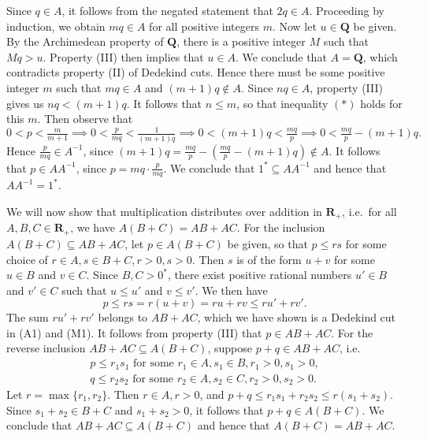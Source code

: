 \documentclass[12pt]{article}
\newcommand{\Q}{\mathbf{Q}}
\newcommand{\R}{\mathbf{R}}
\theoremstyle{definition}
\begin{document}
\begin{enumerate}[label = (M\arabic*)]
\[    \]
    Since \( q \in A \), it follows from the negated statement that \( 2q \in A \). Proceeding by induction, we obtain \( mq \in A \) for all positive integers \( m \). Now let \( u \in \Q \) be given. By the Archimedean property of \( \Q \), there is a positive integer \( M \) such that \( Mq > u \). Property (III) then implies that \( u \in A \). We conclude that \( A = \Q \), which contradicts property (II) of Dedekind cuts. Hence there must be some positive integer \( m \) such that \( mq \in A \) and \( (m+1)q \not\in A \). Since \( nq \in A \), property (III) gives us \( nq < (m+1)q \). It follows that \( n \leq m \), so that inequality \( (*) \) holds for this \( m \). Then observe that
    \[
        0 < p < \tfrac{m}{m+1} \implies 0 < \tfrac{p}{mq} < \tfrac{1}{(m+1)q} \implies 0 < (m+1)q < \tfrac{mq}{p} \implies 0 < \tfrac{mq}{p} - (m+1)q.
    \]
    Hence \( \tfrac{p}{mq} \in A^{-1} \), since \( (m+1)q = \tfrac{mq}{p} - (\tfrac{mq}{p} - (m+1)q) \not\in A \). It follows that \( p \in AA^{-1} \), since \( p = mq \cdot \tfrac{p}{mq} \). We conclude that \( 1^* \subseteq AA^{-1} \) and hence that \( AA^{-1} = 1^* \).    
\end{enumerate}

We will now show that multiplication distributes over addition in \( \R_+ \), i.e.\ for all \( A, B, C \in \R_+ \), we have \( A(B + C) = AB + AC \). For the inclusion \( A(B + C) \subseteq AB + AC \), let \( p \in A(B + C) \) be given, so that \( p \leq rs \) for some choice of \( r \in A, s \in B + C, r > 0, s > 0 \). Then \( s \) is of the form \( u + v \) for some \( u \in B \) and \( v \in C \). Since \( B, C > 0^* \), there exist positive rational numbers \( u' \in B \) and \( v' \in C \) such that \( u \leq u' \) and \( v \leq v' \). We then have
\[
    p \leq rs = r(u + v) = ru + rv \leq ru' + rv'.
\]
The sum \( ru' + rv' \) belongs to \( AB + AC \), which we have shown is a Dedekind cut in (A1) and (M1). It follows from property (III) that \( p \in AB + AC \). For the reverse inclusion \( AB + AC \subseteq A(B + C) \), suppose \( p + q \in AB + AC \), i.e.\
\begin{gather*}
    p \leq r_1 s_1 \text { for some } r_1 \in A, s_1 \in B, r_1 > 0, s_1 > 0, \\
    q \leq r_2 s_2 \text { for some } r_2 \in A, s_2 \in C, r_2 > 0, s_2 > 0.
\end{gather*}
Let \( r = \max\{ r_1, r_2 \} \). Then \( r \in A, r > 0 \), and \( p + q \leq r_1 s_1 + r_2 s_2 \leq r(s_1 + s_2) \). Since \( s_1 + s_2 \in B + C \) and \( s_1 + s_2 > 0 \), it follows that \( p + q \in A(B + C) \). We conclude that \( AB + AC \subseteq A(B + C) \) and hence that \( A(B + C) = AB + AC \).
\end{document}
